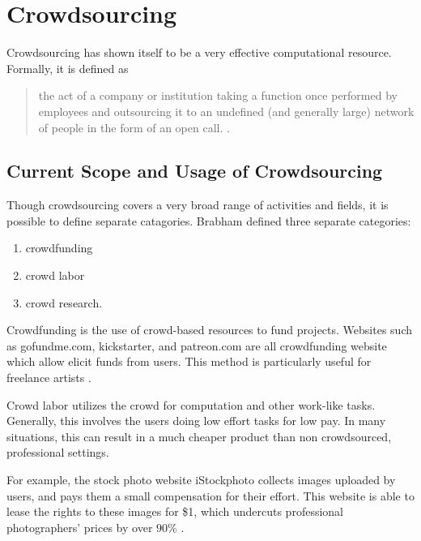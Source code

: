 
\section{Crowdsourcing}
Crowdsourcing has shown itself to be a very effective computational resource.
Formally, it is defined as
\begin{quote}
the act of a company or institution taking a function once performed by employees and outsourcing it to an undefined (and generally large) network of people in the form of an open call. \cite{brabham2008crowdsourcing}.
\end{quote}

\subsection{Current Scope and Usage of Crowdsourcing}
Though crowdsourcing covers a very broad range of activities and fields, it is possible to define separate catagories. Brabham defined three separate categories:
\begin{enumerate}
	\item crowdfunding
	\item crowd labor 
	\item crowd research.
\end{enumerate} 

Crowdfunding is the use of crowd-based resources to fund projects. Websites such as gofundme.com, kickstarter, and patreon.com are all crowdfunding website which allow elicit funds from users. 
This method is particularly useful for freelance artists \cite{brabham2008crowdsourcing}.

Crowd labor utilizes the crowd for computation and other work-like tasks. Generally, this involves the users doing low effort tasks for low pay. 
In many situations, this can result in a much cheaper product than non crowdsourced, professional settings.

For example, the stock photo website iStockphoto collects images uploaded by users, and pays them a small compensation for their effort. This website is able to lease the rights to these images for \$1, which undercuts professional photographers' prices by over $90\%$ \cite{howe2006rise}.




